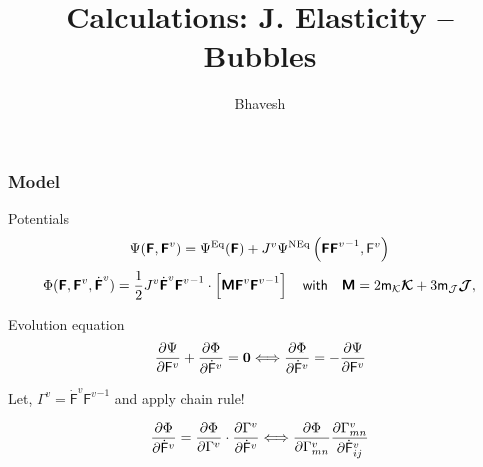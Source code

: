 \documentclass{beamer}
\title{Calculations: J. Elasticity -- Bubbles}
\author{Bhavesh}
\def\myPhi{{\mathrm{\Phi}}}
\def\myPsi{{\mathrm{\Psi}}}
\def\myF{{\mathsf{F}}}
\begin{document}
\frame{\titlepage}

\begin{frame}
\frametitle{Model}\vspace*{-2ex}
\begin{block}{Potentials}
    \begin{equation*}
        \mathrm{\Psi}(\boldsymbol{\mathsf{F}},\boldsymbol{\mathsf{F}}^v)=\mathrm{\Psi}^{{\rm Eq}}(\boldsymbol{\mathsf{F}})
        +J^v\mathrm{\Psi}^{{\rm NEq}}\left(\boldsymbol{\mathsf{F}}{\boldsymbol{\mathsf{F}}^v}^{-1}, \mathsf{F}^v\right) \label{psi_effective}
    \end{equation*}
\begin{equation*}
    \myPhi(\boldsymbol{\mathsf{F}},\boldsymbol{\mathsf{F}}^v,\dot{\boldsymbol{\mathsf{F}}}^v)=\dfrac{1}{2}J^v\dot{\boldsymbol{\mathsf{F}}}^v{\boldsymbol{\mathsf{F}}^v}^{-1}\cdot\left[
    \boldsymbol{\mathsf{M}}{\boldsymbol{\mathsf{F}}}^v{\boldsymbol{\mathsf{F}}^v}^{-1}\right]\quad \textsf{with}\quad \boldsymbol{\mathsf{M}}=2 \mathsf{m}_{\mathcal{K}}\Ktan+3\mathsf{m}_{\mathcal{J}}\Jtan,  \label{phi_effective}
\end{equation*}
\end{block}
\begin{block}{Evolution equation}
    \begin{equation*}
        \del{\Psi}{\mathsf{F}^v}
        +
        \del{\myPhi}{\dot{\mathsf{F}}^v} = {\bf 0} \Longleftrightarrow 
        \del{\myPhi}{\dot{\mathsf{F}}^v} = -\del{\myPsi}{\mathsf{F}^v}
    \end{equation*}
\end{block}
Let, $\Gamma^v = \dot{\mathsf{F}}^v{\mathsf{F}^v}^{-1}$ and apply chain rule!
\begin{block}{}
    \begin{equation*}
        \del{\myPhi}{\dot{\myF}^v}
        =
        \del{\myPhi}{\Gamma^v}\cdot\del{\Gamma^v}{\dot{\myF}^v}\Longleftrightarrow
        \del{\myPhi}{\Gamma^v_{mn}}\del{\Gamma^v_{mn}}{\dot{\myF}^v_{ij}}
    \end{equation*}
\end{block}
\end{frame}
\end{document}
